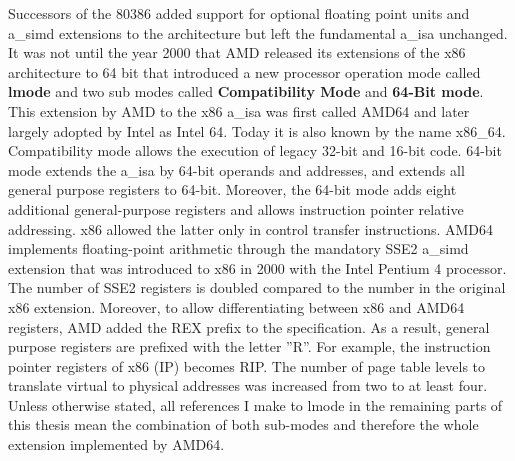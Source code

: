 Successors of the 80386 added support for optional floating point units and
\acrshort{a_simd} extensions to the architecture but left the fundamental
\acrshort{a_isa} unchanged. It was not until the year 2000 that AMD released its
extensions of the x86 architecture to 64 bit that introduced a new processor
operation mode called \textbf{\gls{lmode}} and two sub modes called
\textbf{Compatibility Mode} and \textbf{64-Bit mode}. This extension by AMD to
the x86 \acrshort{a_isa} was first called AMD64 and later largely adopted by
Intel as Intel 64. Today it is also known by the name x86\_64. Compatibility
mode allows the execution of legacy 32-bit and 16-bit code. 64-bit mode extends
the \acrshort{a_isa} by 64-bit operands and addresses, and extends all general
purpose registers to 64-bit. Moreover, the 64-bit mode adds eight additional
general-purpose registers and allows instruction pointer relative addressing.
x86 allowed the latter only in control transfer instructions. AMD64 implements
floating-point arithmetic through the mandatory SSE2 \acrshort{a_simd} extension
that was introduced to x86 in 2000 with the Intel Pentium 4 processor. The
number of SSE2 registers is doubled compared to the number in the original x86
extension. Moreover, to allow differentiating between x86 and AMD64 registers,
AMD added the REX prefix to the specification. As a result, general purpose
registers are prefixed with the letter ''R''. For example, the instruction
pointer registers of x86 (IP) becomes RIP. The number of page table levels to
translate virtual to physical addresses was increased from two to at least
four.\\

Unless otherwise stated, all references I make to \gls{lmode} in the remaining
parts of this thesis mean the combination of both sub-modes and therefore the
whole extension implemented by AMD64.

